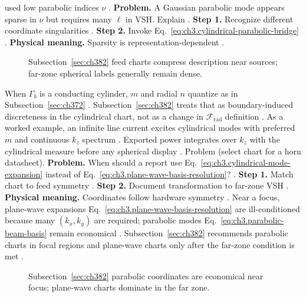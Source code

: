 used low parabolic indices \(\nu\) \cite{hansen1988}.
\textbf{Problem.} A Gaussian parabolic mode appears sparse in \(\nu\) but requires many \(\ell\) in VSH. Explain
\cite{hansen1988}.
\textbf{Step 1.} Recognize different coordinate singularities \cite{stratton1941}.
\textbf{Step 2.} Invoke Eq.~\eqref{eq:ch3.cylindrical-parabolic-bridge} \cite{hansen1988}.
\textbf{Physical meaning.} Sparsity is representation-dependent \cite{harrington2001}.
\begin{figure}[t]
\centering
{}
\caption{Subsection~\ref{sec:ch382} feed charts compress description near sources; far-zone spherical labels generally remain dense.}
\label{fig:ch3.382-feed-to-far}
\end{figure}
When \(\Gamma_{b}\) is a conducting cylinder, \(m\) and radial \(n\) quantize as in Subsection~\ref{sec:ch372}
\cite{stratton1941}. Subsection~\ref{sec:ch382} treats that as boundary-induced discreteness in the
cylindrical chart, not as a change in \(\mathcal{F}_{\mathrm{rad}}\) definition \cite{hansen1988}.
As a worked example, an infinite line current excites cylindrical modes with preferred \(m\) and continuous \(k_{z}\) spectrum
\cite{jackson1999}. Exported power integrates over \(k_{z}\) with the cylindrical measure before any spherical display
\cite{harrington2001}.
Problem (select chart for a horn datasheet). \textbf{Problem.} When should a report use Eq.~\eqref{eq:ch3.cylindrical-mode-expansion} instead of
Eq.~\eqref{eq:ch3.plane-wave-basis-resolution}? \cite{harrington2001}.
\textbf{Step 1.} Match chart to feed symmetry \cite{stratton1941}.
\textbf{Step 2.} Document transformation to far-zone VSH \cite{hansen1988}.
\textbf{Physical meaning.} Coordinates follow hardware symmetry \cite{harrington2001}.
Near a focus, plane-wave expansions Eq.~\eqref{eq:ch3.plane-wave-basis-resolution} are ill-conditioned because many
\((k_{x},k_{y})\) are required; parabolic modes Eq.~\eqref{eq:ch3.parabolic-beam-basis} remain economical
\cite{jackson1999}. Subsection~\ref{sec:ch382} recommends parabolic charts in focal regions and plane-wave
charts only after the far-zone condition is met \cite{hansen1988}.
\begin{figure}[t]
\centering
{}
\caption{Subsection~\ref{sec:ch382} parabolic coordinates are economical near focus; plane-wave charts dominate in the far zone.}
\label{fig:ch3.382-focus-handoff}
\end{figure}
